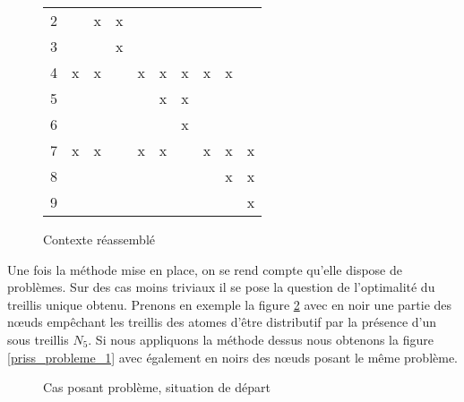 \begin{figure}[H]
\begin{minipage}[c]{0.7\textwidth}
\begin{center}
\begin{tabular}{ l | c c c c c c c c c }
			2 & & x & x & & & & & & \\
			3 & & & x & & & & & & \\
			4 & x & x & & x & x & x & x & x & \\
			5 & & & & & x & x & & & \\
			6 & & & & & & x & & & \\
			7 & x & x & & x & x & & x & x & x \\
			8 & & & & & & & & x & x \\
			9 & & & & & & & & & x \\
		\end{tabular}
	\end{center}
	\caption{Contexte réassemblé}
	\label{contexte_reassemble}
	\end{minipage}
\end{figure}

Une fois la méthode mise en place, on se rend compte qu'elle dispose de problèmes. Sur des cas moins triviaux il se pose la question de l'optimalité du treillis unique obtenu. Prenons en exemple la figure \ref{priss_probleme_base} avec en noir une partie des n\oe uds empêchant les treillis des atomes d'être distributif par la présence d'un sous treillis $N_5$. Si nous appliquons la méthode dessus nous obtenons la figure \ref{priss_probleme_1} avec également en noirs des n\oe uds posant le même problème.

\begin{figure}[H]
	\begin{center}
	\end{center}
	\caption{Cas posant problème, situation de départ}
	\label{priss_probleme_base}
\end{figure}

